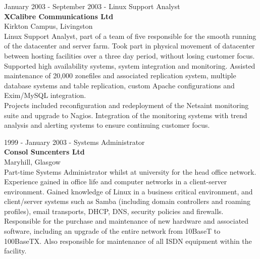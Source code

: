 \documentclass[10pt]{report}
\begin{document}
\clearpage

\begin{flushleft}
January 2003 - September 2003 - Linux Support Analyst\\
{\bf XCalibre Communications Ltd}\\
Kirkton Campus, Livingston\\
Linux Support Analyst, part of a team of five responsible for the smooth running of the datacenter and server farm. Took part in physical movement of datacenter between hosting facilities over a three day period, without losing customer focus. Supported high availability systems, system integration and monitoring. Assisted maintenance of 20,000 zonefiles and associated replication system, multiple database systems and table replication, custom Apache configurations and Exim/MySQL integration.\\
Projects included reconfiguration and redeployment of the Netsaint monitoring suite and upgrade to Nagios. Integration of the monitoring systems with trend analysis and alerting systems to ensure continuing customer focus.
\end{flushleft}


\begin{flushleft}
1999 - January 2003 - Systems Administrator\\
{\bf Consol Suncenters Ltd}\\
Maryhill, Glasgow\\
Part-time Systems Administrator whilst at university for the head office network. Experience gained in office life and computer networks in a client-server environment. Gained knowledge of Linux in a business critical environment, and client/server systems such as Samba (including domain controllers and roaming profiles), email transports, DHCP, DNS, security policies and firewalls. Responsible for the purchase and maintenance of new hardware and associated software, including an upgrade of the entire network from 10BaseT to 100BaseTX. Also responsible for maintenance of all ISDN equipment within the facility.
\end{flushleft}

\end{document}

